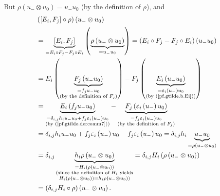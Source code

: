 \documentclass[etingof-lie.tex]{subfiles}
\begin{document}
\begin{verlong}
But $\rho\left(  u_{-}\otimes u_{0}\right)  =u_{-}u_{0}$ (by the definition of
$\rho$), and%
\begin{align*}
&  \left(  \left[  E_{i},F_{j}\right]  \circ\rho\right)  \left(  u_{-}\otimes
u_{0}\right) \\
&  =\underbrace{\left[  E_{i},F_{j}\right]  }_{=E_{i}\circ F_{j}-F_{j}\circ
E_{i}}\left(  \underbrace{\rho\left(  u_{-}\otimes u_{0}\right)  }%
_{=u_{-}u_{0}}\right)  =\left(  E_{i}\circ F_{j}-F_{j}\circ E_{i}\right)
\left(  u_{-}u_{0}\right) \\
&  =E_{i}\left(  \underbrace{F_{j}\left(  u_{-}u_{0}\right)  }%
_{\substack{=f_{j}u_{-}u_{0}\\\text{(by the definition of }F_{j}\text{)}%
}}\right)  -F_{j}\left(  \underbrace{E_{i}\left(  u_{-}u_{0}\right)
}_{\substack{=\varepsilon_{i}\left(  u_{-}\right)  u_{0}\\\text{(by
(\ref{pf.gtilde.b.Ei}))}}}\right) \\
&  =\underbrace{E_{i}\left(  f_{j}u_{-}u_{0}\right)  }_{\substack{=\delta
_{i,j}h_{i}u_{-}u_{0}+f_{j}\varepsilon_{i}\left(  u_{-}\right)  u_{0}%
\\\text{(by (\ref{pf.gtilde.dercomm7}))}}}-\underbrace{F_{j}\left(
\varepsilon_{i}\left(  u_{-}\right)  u_{0}\right)  }_{\substack{=f_{j}%
\varepsilon_{i}\left(  u_{-}\right)  u_{0}\\\text{(by the definition of }%
F_{j}\text{)}}}\\
&  =\delta_{i,j}h_{i}u_{-}u_{0}+f_{j}\varepsilon_{i}\left(  u_{-}\right)
u_{0}-f_{j}\varepsilon_{i}\left(  u_{-}\right)  u_{0}=\delta_{i,j}%
h_{i}\underbrace{u_{-}u_{0}}_{=\rho\left(  u_{-}\otimes u_{0}\right)  }\\
&  =\delta_{i,j}\underbrace{h_{i}\rho\left(  u_{-}\otimes u_{0}\right)
}_{\substack{=H_{i}\left(  \rho\left(  u_{-}\otimes u_{0}\right)  \right)
\\\text{(since the definition of }H_{i}\text{ yields}\\H_{i}\left(
\rho\left(  u_{-}\otimes u_{0}\right)  \right)  =h_{i}\rho\left(  u_{-}\otimes
u_{0}\right)  \text{)}}}=\delta_{i,j}H_{i}\left(  \rho\left(  u_{-}\otimes
u_{0}\right)  \right) \\
&  =\left(  \delta_{i,j}H_{i}\circ\rho\right)  \left(  u_{-}\otimes
u_{0}\right)  .
\end{align*}



\end{verlong}
\end{document}
